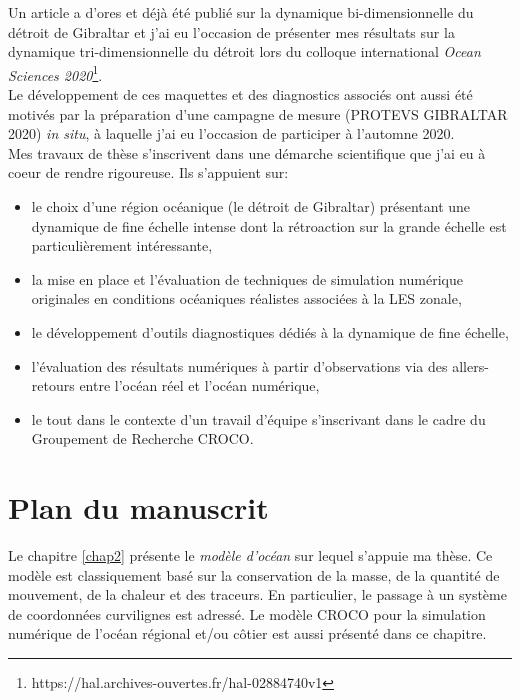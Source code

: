 Un article a d'ores et déjà été publié sur la dynamique bi-dimensionnelle du détroit de Gibraltar \citep{hilt_2020} et j'ai eu l'occasion de présenter mes résultats sur la dynamique tri-dimensionnelle du détroit lors du colloque international \textit{Ocean Sciences 2020}\footnote{https://hal.archives-ouvertes.fr/hal-02884740v1}.\\

Le développement de ces maquettes et des diagnostics associés ont aussi été motivés par la préparation d'une campagne de mesure (PROTEVS GIBRALTAR 2020) \textit{in situ}, à laquelle j'ai eu l'occasion de participer à l'automne 2020. \\


Mes travaux de thèse s'inscrivent  dans une démarche scientifique que j'ai eu à coeur de rendre rigoureuse. Ils s'appuient sur:
\begin{itemize}
\setlength\itemsep{0pt}
    \item le choix d'une région océanique (le détroit de Gibraltar) présentant une dynamique de fine échelle intense dont la rétroaction sur la grande échelle est particulièrement intéressante,
    \item la mise en place et l'évaluation de techniques de simulation numérique originales en conditions océaniques réalistes associées à la LES zonale,
    \item le développement d'outils diagnostiques dédiés à la dynamique de fine échelle,
    \item l'évaluation des résultats numériques à partir d'observations via des allers-retours entre l'océan réel et l'océan numérique,
    \item le tout dans le contexte d'un travail d'équipe s'inscrivant dans le cadre du Groupement de Recherche CROCO.
\end{itemize}

\section{Plan du manuscrit}

Le chapitre \ref{chap2} présente le \textit{modèle d'océan} sur lequel s'appuie ma thèse. Ce modèle est classiquement basé sur la conservation de la masse, de la quantité de mouvement, de la chaleur et des traceurs. En particulier, le passage à un système de coordonnées curvilignes est adressé. Le modèle  CROCO pour la simulation numérique de l'océan régional et/ou côtier est aussi présenté dans ce chapitre.

